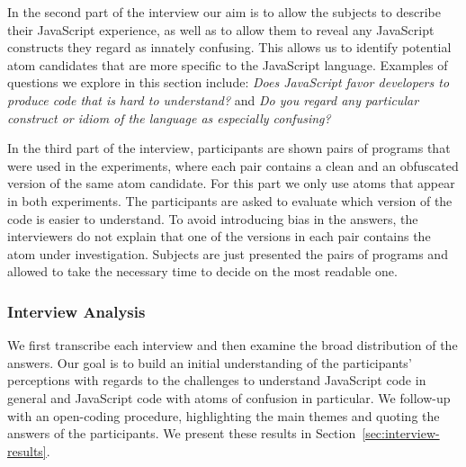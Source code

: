 In the second part of the interview our aim is to allow the subjects to describe their JavaScript experience, as well as to allow them to reveal any JavaScript constructs they regard as innately confusing. This allows us to identify potential atom candidates that are more specific to the JavaScript language. Examples of questions we explore in this section include: \emph{Does JavaScript favor developers to produce code that is hard to understand?} and \emph{Do you regard any particular construct or idiom of the language as especially confusing?}

In the third part of the interview, participants are shown pairs of programs that were used in the experiments, where each pair contains a clean and an obfuscated version of the same atom candidate. For this part we only use atoms that appear in both experiments. The participants 
are asked to evaluate which version of the code is easier to understand. To avoid introducing bias in the answers, the interviewers do not explain that one of the versions in each pair contains the atom under investigation. Subjects are just presented the pairs of programs and allowed to take the necessary time to decide on the most readable one.

\subsubsection*{Interview Analysis}

We first transcribe each interview and then examine the broad distribution of the answers. Our goal is to build an initial understanding of the participants' perceptions with regards to the challenges to understand JavaScript code in general and JavaScript code with atoms of confusion in particular. We follow-up with an open-coding procedure, highlighting the main themes and quoting the answers of the participants. We present these results in Section~\ref{sec:interview-results}. 




